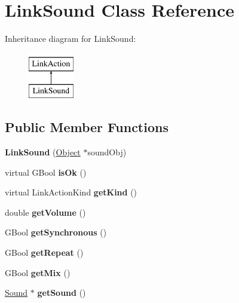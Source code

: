 \hypertarget{class_link_sound}{}\section{Link\+Sound Class Reference}
\label{class_link_sound}
Inheritance diagram for Link\+Sound\+:\begin{figure}[H]
\begin{center}
\leavevmode
\includegraphics[height=2.000000cm]{class_link_sound}
\end{center}
\end{figure}
\subsection*{Public Member Functions}
\begin{DoxyCompactItemize}
\item 
\mbox{\label{class_link_sound_a647653fa9edbbc1bb7b6639b874dfbb7}} 
{\bfseries Link\+Sound} (\hyperlink{class_object}{Object} $\ast$sound\+Obj)
\item 
\mbox{\label{class_link_sound_ad143243ea17d54cf966db0b186dc0977}} 
virtual G\+Bool {\bfseries is\+Ok} ()
\item 
\mbox{\label{class_link_sound_a79562826903a9b8183fdd3e2bc713b59}} 
virtual Link\+Action\+Kind {\bfseries get\+Kind} ()
\item 
\mbox{\label{class_link_sound_afd34352ed3a286786baaad4aa9e7aca2}} 
double {\bfseries get\+Volume} ()
\item 
\mbox{\label{class_link_sound_ad131c109ef1fd6caf59c8ebda1864507}} 
G\+Bool {\bfseries get\+Synchronous} ()
\item 
\mbox{\label{class_link_sound_a82779e4597bd9f40ce92f741a5d678c0}} 
G\+Bool {\bfseries get\+Repeat} ()
\item 
\mbox{\label{class_link_sound_a67bef7a5ada357fd757f32354681b4b5}} 
G\+Bool {\bfseries get\+Mix} ()
\item 
\mbox{\label{class_link_sound_a672722b8bb20290805b4aa7ee52bc52f}} 
\hyperlink{class_sound}{Sound} $\ast$ {\bfseries get\+Sound} ()
\end{DoxyCompactItemize}
